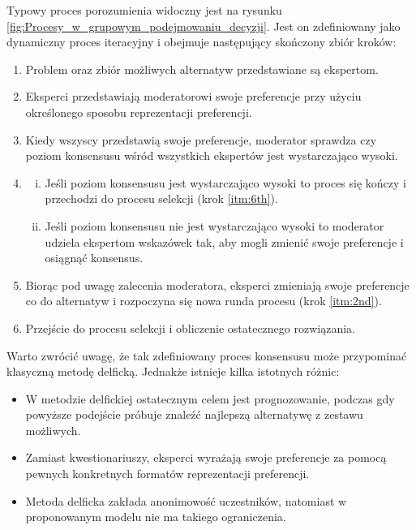 Typowy proces
porozumienia widoczny jest na rysunku
\ref{fig:Procesy_w_grupowym_podejmowaniu_decyzji}. Jest on zdefiniowany jako
dynamiczny proces iteracyjny i obejmuje następujący skończony zbiór kroków:
\begin{enumerate}[1.]
  \item Problem oraz zbiór możliwych alternatyw przedstawiane są ekspertom.
  
  \item \label{itm:2nd} Eksperci przedstawiają moderatorowi swoje preferencje
  przy użyciu określonego sposobu reprezentacji preferencji.
  
  \item Kiedy wszyscy przedstawią swoje preferencje, moderator sprawdza czy 
  poziom konsensusu wśród wszystkich ekspertów jest wystarczająco wysoki.
  
  \item 
  \begin{enumerate}[i)]
    \item Jeśli poziom konsensusu jest wystarczająco wysoki to proces się kończy
    i przechodzi do procesu selekcji (krok \ref{itm:6th}).
	\item Jeśli poziom konsensusu nie jest wystarczająco wysoki to moderator 
	udziela ekspertom wskazówek tak, aby mogli zmienić swoje preferencje i 
	osiągnąć konsensus.
  \end{enumerate}
  
  \item Biorąc pod uwagę zalecenia moderatora, eksperci zmieniają swoje
  preferencje co do alternatyw i rozpoczyna się nowa runda procesu (krok
  \ref{itm:2nd}).
  
  \item \label{itm:6th} Przejście do procesu selekcji i obliczenie
  ostatecznego rozwiązania.

\end{enumerate}

Warto zwrócić uwagę, że tak zdefiniowany proces konsensusu może przypominać 
klasyczną metodę delficką. Jednakże istnieje kilka istotnych różnic:
\begin{itemize}
  \item W metodzie delfickiej ostatecznym celem jest prognozowanie, podczas gdy 
  powyższe podejście próbuje znaleźć najlepszą alternatywę z zestawu możliwych.
  \item Zamiast kwestionariuszy, eksperci wyrażają swoje preferencje za pomocą 
  pewnych konkretnych formatów reprezentacji preferencji.
  \item Metoda delficka zakłada anonimowość uczestników, natomiast w 
  proponowanym modelu nie ma takiego ograniczenia.
\end{itemize}


